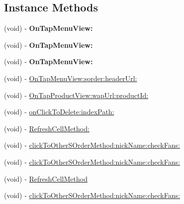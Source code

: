 \subsection*{Instance Methods}
\begin{DoxyCompactItemize}
\item 
\mbox{\label{protocol_menu_cell_click_delegate_01-p_a6b1931131c0cde82a00ab7b62f23053b}} 
(void) -\/ {\bfseries On\+Tap\+Menu\+View\+:}
\item 
\mbox{\label{protocol_menu_cell_click_delegate_01-p_a6b1931131c0cde82a00ab7b62f23053b}} 
(void) -\/ {\bfseries On\+Tap\+Menu\+View\+:}
\item 
\mbox{\label{protocol_menu_cell_click_delegate_01-p_a6b1931131c0cde82a00ab7b62f23053b}} 
(void) -\/ {\bfseries On\+Tap\+Menu\+View\+:}
\item 
(void) -\/ \mbox{\hyperlink{protocol_menu_cell_click_delegate_01-p_aeb81e18fdc445f400daea8e833ce247d}{On\+Tap\+Menu\+View\+:sorder\+:header\+Url\+:}}
\item 
(void) -\/ \mbox{\hyperlink{protocol_menu_cell_click_delegate_01-p_a4eeab25dfd19ab6f74831a18a8e79d16}{On\+Tap\+Product\+View\+:wap\+Url\+:product\+Id\+:}}
\item 
(void) -\/ \mbox{\hyperlink{protocol_menu_cell_click_delegate_01-p_aa15eb38dbf77b759f918767901da1088}{on\+Click\+To\+Delete\+:index\+Path\+:}}
\item 
(void) -\/ \mbox{\hyperlink{protocol_menu_cell_click_delegate_01-p_a0100a41fecfc0ee4e2f80fd213301363}{Refresh\+Cell\+Method\+:}}
\item 
(void) -\/ \mbox{\hyperlink{protocol_menu_cell_click_delegate_01-p_a058ff67514f16b8e96379c8fdf04562a}{click\+To\+Other\+S\+Order\+Method\+:nick\+Name\+:check\+Fans\+:}}
\item 
(void) -\/ \mbox{\hyperlink{protocol_menu_cell_click_delegate_01-p_a058ff67514f16b8e96379c8fdf04562a}{click\+To\+Other\+S\+Order\+Method\+:nick\+Name\+:check\+Fans\+:}}
\item 
(void) -\/ \mbox{\hyperlink{protocol_menu_cell_click_delegate_01-p_ab01143ca90e15eea3b064b677a128ba0}{Refresh\+Cell\+Method}}
\item 
(void) -\/ \mbox{\hyperlink{protocol_menu_cell_click_delegate_01-p_a058ff67514f16b8e96379c8fdf04562a}{click\+To\+Other\+S\+Order\+Method\+:nick\+Name\+:check\+Fans\+:}}
\end{DoxyCompactItemize}


